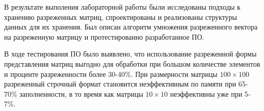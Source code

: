 \Conclusion

В результате выполения лабораторной работы были исследованы подходы к хранению разреженных матриц, спроектированы и реализованы структуры данных для их хранения. Был описан алгоритм умножения разреженного вектора на разреженную матрицу и протестированно разработанное ПО.

В ходе тестирования ПО было выявлено, что использование разреженной формы представления матриц выгодно для обработки при большом количестве элементов и проценте разреженности более 30-40\%. При размерности матрицы $100\times100$ разреженный строчный формат становится неэффективным по памяти при 65-70\% заполненности, в то время как матрицы $10\times10$ неэффективны уже при 5-7\%.